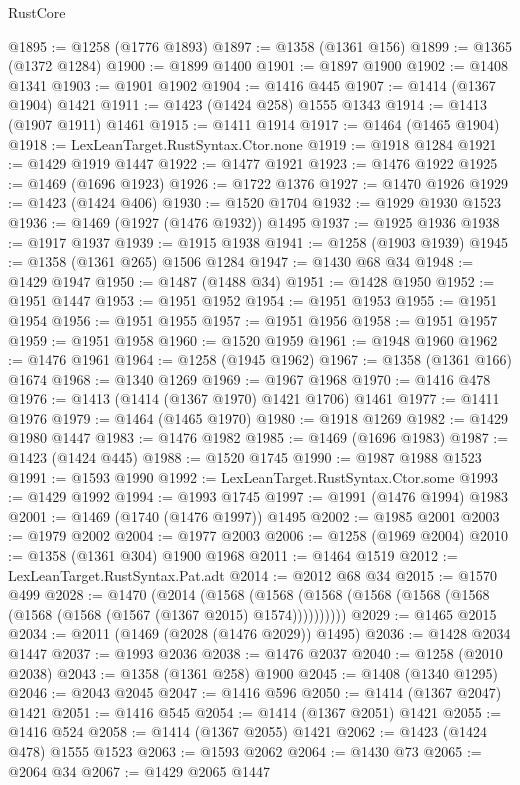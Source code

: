 \begin{lexlean}{RustCore}
\begin{coremodule}
@1895 := @1258 (@1776 @1893)
@1897 := @1358 (@1361 @156)
@1899 := @1365 (@1372 @1284)
@1900 := @1899 @1400
@1901 := @1897 @1900
@1902 := @1408 @1341
@1903 := @1901 @1902
@1904 := @1416 @445
@1907 := @1414 (@1367 @1904) @1421
@1911 := @1423 (@1424 @258) @1555 @1343
@1914 := @1413 (@1907 @1911) @1461
@1915 := @1411 @1914
@1917 := @1464 (@1465 @1904)
@1918 := LexLeanTarget.RustSyntax.Ctor.none
@1919 := @1918 @1284
@1921 := @1429 @1919 @1447
@1922 := @1477 @1921
@1923 := @1476 @1922
@1925 := @1469 (@1696 @1923)
@1926 := @1722 @1376
@1927 := @1470 @1926
@1929 := @1423 (@1424 @406)
@1930 := @1520 @1704
@1932 := @1929 @1930 @1523
@1936 := @1469 (@1927 (@1476 @1932)) @1495
@1937 := @1925 @1936
@1938 := @1917 @1937
@1939 := @1915 @1938
@1941 := @1258 (@1903 @1939)
@1945 := @1358 (@1361 @265) @1506 @1284
@1947 := @1430 @68 @34
@1948 := @1429 @1947
@1950 := @1487 (@1488 @34)
@1951 := @1428 @1950
@1952 := @1951 @1447
@1953 := @1951 @1952
@1954 := @1951 @1953
@1955 := @1951 @1954
@1956 := @1951 @1955
@1957 := @1951 @1956
@1958 := @1951 @1957
@1959 := @1951 @1958
@1960 := @1520 @1959
@1961 := @1948 @1960
@1962 := @1476 @1961
@1964 := @1258 (@1945 @1962)
@1967 := @1358 (@1361 @166) @1674
@1968 := @1340 @1269
@1969 := @1967 @1968
@1970 := @1416 @478
@1976 := @1413 (@1414 (@1367 @1970) @1421 @1706) @1461
@1977 := @1411 @1976
@1979 := @1464 (@1465 @1970)
@1980 := @1918 @1269
@1982 := @1429 @1980 @1447
@1983 := @1476 @1982
@1985 := @1469 (@1696 @1983)
@1987 := @1423 (@1424 @445)
@1988 := @1520 @1745
@1990 := @1987 @1988 @1523
@1991 := @1593 @1990
@1992 := LexLeanTarget.RustSyntax.Ctor.some
@1993 := @1429 @1992
@1994 := @1993 @1745
@1997 := @1991 (@1476 @1994) @1983
@2001 := @1469 (@1740 (@1476 @1997)) @1495
@2002 := @1985 @2001
@2003 := @1979 @2002
@2004 := @1977 @2003
@2006 := @1258 (@1969 @2004)
@2010 := @1358 (@1361 @304) @1900 @1968
@2011 := @1464 @1519
@2012 := LexLeanTarget.RustSyntax.Pat.adt
@2014 := @2012 @68 @34
@2015 := @1570 @499
@2028 := @1470
    (@2014
      (@1568 (@1568 (@1568 (@1568 (@1568 (@1568 (@1568 (@1568 (@1567 (@1367 @2015) @1574))))))))))
@2029 := @1465 @2015
@2034 := @2011 (@1469 (@2028 (@1476 @2029)) @1495)
@2036 := @1428 @2034 @1447
@2037 := @1993 @2036
@2038 := @1476 @2037
@2040 := @1258 (@2010 @2038)
@2043 := @1358 (@1361 @258) @1900
@2045 := @1408 (@1340 @1295)
@2046 := @2043 @2045
@2047 := @1416 @596
@2050 := @1414 (@1367 @2047) @1421
@2051 := @1416 @545
@2054 := @1414 (@1367 @2051) @1421
@2055 := @1416 @524
@2058 := @1414 (@1367 @2055) @1421
@2062 := @1423 (@1424 @478) @1555 @1523
@2063 := @1593 @2062
@2064 := @1430 @73
@2065 := @2064 @34
@2067 := @1429 @2065 @1447

\end{coremodule}
\end{lexlean}
